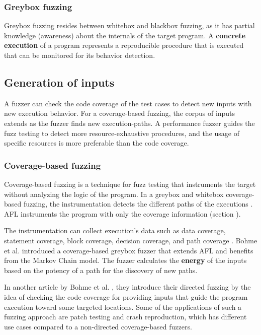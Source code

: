 \subsubsection{Greybox fuzzing}

Greybox fuzzing resides between whitebox and blackbox fuzzing, as it has partial knowledge (awareness) about the internals of the target program. A \textbf{concrete execution} of a program represents a reproducible procedure that is executed that can be monitored for its behavior detection.

\subsection{Generation of inputs}

A fuzzer can check the code coverage of the test cases to detect new inputs with new execution behavior. For a coverage-based fuzzing, the corpus of inputs extends as the fuzzer finds new execution-paths. A performance fuzzer guides the fuzz testing to detect more resource-exhaustive procedures, and the usage of specific resources is more preferable than the code coverage.

\subsubsection{Coverage-based fuzzing}

Coverage-based fuzzing is a technique for fuzz testing that instruments the target without analyzing the logic of the program. In a greybox and whitebox coverage-based fuzzing, the instrumentation detects the different paths of the executions \cite{liang2018fuzzing}. AFL instruments the program with only the coverage information (section ).

The instrumentation can collect execution's data such as data coverage, statement coverage, block coverage, decision coverage, and path coverage \cite{yang2009survey}. Bohme et al. \cite{bohme2017coverage} introduced a coverage-based greybox fuzzer that extends AFL and benefits from the Markov Chain model. The fuzzer calculates the \textbf{energy} of the inputs based on the potency of a path for the discovery of new paths.

In another article by Bohme et al. \cite{bohme2017directed}, they introduce their directed fuzzing by the idea of checking the code coverage for providing inputs that guide the program execution toward some targeted locations. Some of the applications of such a fuzzing approach are patch testing and crash reproduction, which has different use cases compared to a non-directed coverage-based fuzzers.

